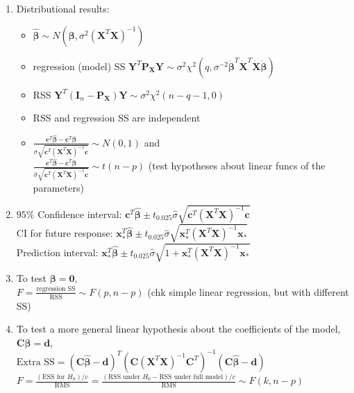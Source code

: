 \documentclass[11pt,a4paper]{article}
\begin{document}
\begin{enumerate}
\item Distributional results: \begin{itemize}
\item $\hat{\boldsymbol \beta} \sim N(\boldsymbol \beta, \sigma^2 (\mathbf{X}^T \mathbf{X})^{-1})$
\item regression (model) SS $\mathbf{Y}^T \mathbf{P}_{\mathbf{X}} \mathbf{Y} \sim \sigma^2 \chi^2 (q, \sigma^{-2} \dot{\boldsymbol \beta}^T \dot{\mathbf{X}}^T \dot{\mathbf{X}} \dot{\boldsymbol \beta})$
\item RSS $\mathbf{Y}^T (\mathbf{I}_n - \mathbf{P}_\mathbf{X}) \mathbf{Y} \sim \sigma^2 \chi^2 (n-q-1, 0)$
\item RSS and regression SS are independent
\item $\displaystyle \frac{\mathbf{c}^T \hat{\boldsymbol \beta} - \mathbf{c}^T \boldsymbol \beta}{\sigma \sqrt{\mathbf{c}^T (\mathbf{X}^T \mathbf{X})^{-1} \mathbf{c}}} \sim N(0,1)$ and \\
$\displaystyle \frac{\mathbf{c}^T \hat{\boldsymbol \beta} - \mathbf{c}^T \boldsymbol \beta}{\hat{\sigma} \sqrt{\mathbf{c}^T (\mathbf{X}^T \mathbf{X})^{-1} \mathbf{c}}} \sim t(n-p)$ (test hypotheses about linear funcs of the parameters)
\end{itemize}

\item $95\%$ Confidence interval: $\mathbf{c}^T \hat{\boldsymbol \beta} \pm t_{0.025} \hat{\sigma} \sqrt{\mathbf{c}^T (\mathbf{X}^T \mathbf{X})^{-1} \mathbf{c}}$ \\
CI for future response: $\mathbf{x}_*^T \hat{\boldsymbol \beta} \pm t_{0.025} \hat{\sigma} \sqrt{\mathbf{x}_*^T (\mathbf{X}^T \mathbf{X})^{-1} \mathbf{x}_*}$ \\
Prediction interval: $\mathbf{x}_*^T \hat{\boldsymbol \beta} \pm t_{0.025} \hat{\sigma} \sqrt{1 + \mathbf{x}_*^T (\mathbf{X}^T \mathbf{X})^{-1} \mathbf{x}_*}$

\item To test $\boldsymbol \beta = \mathbf{0}$, \\$F = \frac{\text{regression SS}}{\text{RSS}} \sim F(p, n-p)$ (chk simple linear regression, but with different SS)

\item To test a more general linear hypothesis about the
coefficients of the model, $\mathbf{C} \boldsymbol \beta = \mathbf{d}$, \\
$\text{Extra SS} = \left( \mathbf{C} \hat{\boldsymbol \beta} - \mathbf{d} \right)^T \left( \mathbf{C} (\mathbf{X}^T \mathbf{X})^{-1} \mathbf{C}^T \right)^{-1} \left( \mathbf{C} \hat{\boldsymbol \beta} - \mathbf{d} \right)$ \\
$\displaystyle F = \frac{(\text{ESS for }H_0) /c}{\text{RMS}} = \frac{(\text{RSS under } H_0 - \text{RSS under full model}) /c}{\text{RMS}} \sim F(k,n-p)$
\end{enumerate}
\end{document}
